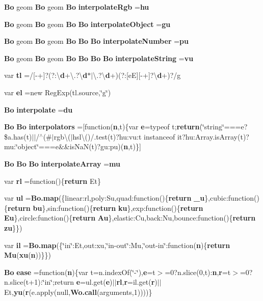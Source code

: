 \begin{DoxyCompactItemize}
\item 
{\bf Bo} geom {\bf Bo} geom {\bf Bo} {\bf interpolate\+Rgb} ={\bf hu}
\item 
{\bf Bo} geom {\bf Bo} geom {\bf Bo} {\bf Bo} {\bf interpolate\+Object} ={\bf gu}
\item 
{\bf Bo} geom {\bf Bo} geom {\bf Bo} {\bf Bo} {\bf Bo} {\bf interpolate\+Number} ={\bf pu}
\item 
{\bf Bo} geom {\bf Bo} geom {\bf Bo} {\bf Bo} {\bf Bo} {\bf Bo} {\bf interpolate\+String} ={\bf vu}
\item 
var {\bf tl} =/[-\/+]?(?\+:\textbackslash{}{\bf d}+\textbackslash{}.?\textbackslash{}{\bf d}$\ast$$\vert$\textbackslash{}.?\textbackslash{}{\bf d}+)(?\+:[e\+E][-\/+]?\textbackslash{}{\bf d}+)?/g
\item 
var {\bf el} =new Reg\+Exp(tl.\+source,\char`\"{}g\char`\"{})
\item 
{\bf Bo} {\bf interpolate} ={\bf du}
\item 
{\bf Bo} {\bf Bo} {\bf interpolators} =[function({\bf n},t)\{var {\bf e}=typeof t;{\bf return}(\char`\"{}string\char`\"{}===e?\$a.\+has(t)$\vert$$\vert$/$^\wedge$(\#$\vert$rgb\textbackslash{}($\vert$hsl\textbackslash{}()/.test(t)?hu\+:vu\+:t instanceof it?hu\+:\+Array.\+is\+Array(t)?mu\+:\char`\"{}object\char`\"{}===e\&\&is\+Na\+N(t)?gu\+:pu)({\bf n},t)\}]
\item 
{\bf Bo} {\bf Bo} {\bf Bo} {\bf interpolate\+Array} ={\bf mu}
\item 
var {\bf rl} =function()\{{\bf return} Et\}
\item 
var {\bf ul} ={\bf Bo.\+map}(\{linear\+:rl,poly\+:\+Su,quad\+:function()\{{\bf return} {\bf \+\_\+u}\},cubic\+:function()\{{\bf return} {\bf bu}\},sin\+:function()\{{\bf return} {\bf ku}\},exp\+:function()\{{\bf return} {\bf Eu}\},circle\+:function()\{{\bf return} {\bf Au}\},elastic\+:\+Cu,back\+:\+Nu,bounce\+:function()\{{\bf return} {\bf zu}\}\})
\item 
var {\bf il} ={\bf Bo.\+map}(\{\char`\"{}in\char`\"{}\+:Et,out\+:xu,\char`\"{}in-\/out\char`\"{}\+:Mu,\char`\"{}out-\/in\char`\"{}\+:function({\bf n})\{{\bf return} {\bf Mu}({\bf xu}({\bf n}))\}\})
\item 
{\bf Bo} {\bf ease} =function({\bf n})\{var t=n.\+index\+Of(\char`\"{}-\/\char`\"{}),{\bf e}=t$>$=0?n.\+slice(0,t)\+:{\bf n},{\bf r}=t$>$=0?n.\+slice(t+1)\+:\char`\"{}in\char`\"{};return {\bf e}=ul.\+get({\bf e})$\vert$$\vert${\bf rl},{\bf r}=il.\+get({\bf r})$\vert$$\vert$Et,{\bf yu}({\bf r}(e.\+apply(null,{\bf Wo.\+call}(arguments,1))))\}

\end{DoxyCompactItemize}
